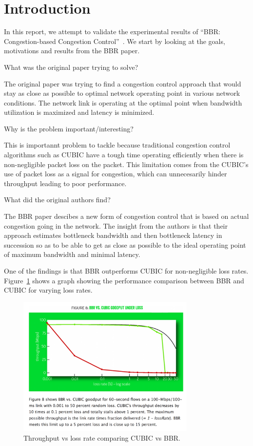 
\section{Introduction}
In this report, we attempt to validate the experimental results of ``BBR:
Congestion-based Congestion Control''~\cite{cardwell2016bbr}. We start
by looking at the goals, motivations and results from the BBR
\cite{cardwell2016bbr} paper.

What was the original paper trying to solve?

The original paper was trying to find a congestion control approach
that would stay as close as possible to optimal network operating point
in various network conditions. The network link is operating at the optimal
point when bandwidth utilization is maximized and latency is minimized.

Why is the problem important/interesting?

This is importannt problem to tackle because traditional congestion control
algorithms such as CUBIC have a tough time operating efficiently when there
is non-negligible packet loss on the packet. This limitation comes from the
CUBIC's use of packet loss as a signal for congestion, which can unnecesarily
hinder throughput leading to poor performance.


What did the original authors find?

The BBR paper descibes a new form of congestion control that is based on actual
congestion going in the network. The insight from the authors is that their
approach estimates bottleneck bandwidth and then bottleneck latency in succession
so as to be able to get as close as possible to the ideal operating point of
maximum bandwidth and minimal latency.

One of the findings is that BBR outperforms CUBIC for non-negligible loss rates.
Figure~\ref{fig:bbr} shows a graph showing the performance comparison between BBR and CUBIC
for varying loss rates.




\begin{figure}[h]
  \centering
  \includegraphics[height=7cm]{./img/bbr_fig8.png}
  \caption{Throughput vs loss rate comparing CUBIC vs BBR.}
  \label{fig:bbr}
\end{figure}